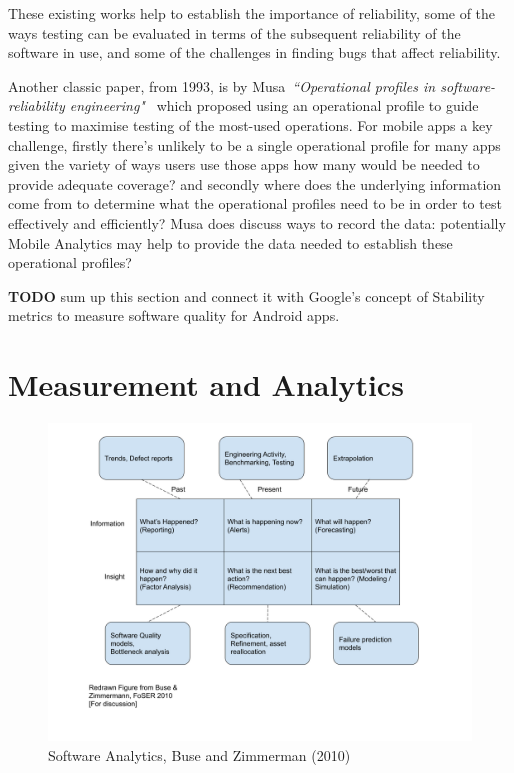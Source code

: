 These existing works help to establish the importance of reliability, some of the ways testing can be evaluated in terms of the subsequent reliability of the software in use, and some of the challenges in finding bugs that affect reliability. 

Another classic paper, from 1993, is by Musa~\emph{``Operational profiles in software-reliability engineering"}~\cite{musa1993_operational_profiles} which proposed using an operational profile to guide testing to maximise testing of the most-used operations. For mobile apps a key challenge, firstly there's unlikely to be a single operational profile for many apps given the variety of ways users use those apps how many would be needed to provide adequate coverage? and secondly where does the underlying information come from to determine what the operational profiles need to be in order to test effectively and efficiently? Musa does discuss ways to record the data: potentially Mobile Analytics may help to provide the data needed to establish these operational profiles? 

\textbf{TODO} sum up this section and connect it with Google's concept of Stability metrics to measure software quality for Android apps.

\section{Measurement and Analytics}

\begin{figure}
    \centering
    \includegraphics[width=14cm]{images/Buse_and_Zimmermann_2010_figure.png}
    \caption{Software Analytics, Buse and Zimmerman (2010)}
    \label{fig:software_analytics_buse_and_zimmerman_2010}
\end{figure}

